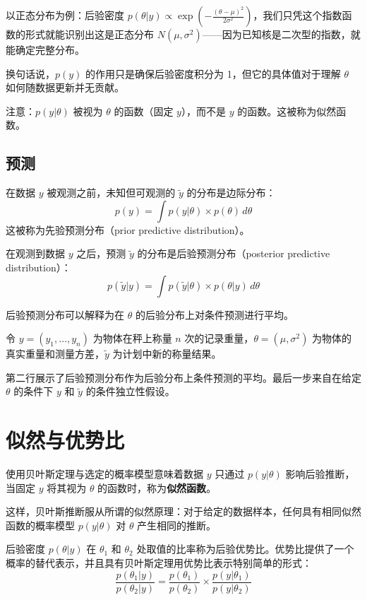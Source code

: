 以正态分布为例：后验密度 $p(\theta|y) \propto \exp\left(-\frac{(\theta-\mu)^2}{2\sigma^2}\right)$，我们只凭这个指数函数的形式就能识别出这是正态分布 $N(\mu, \sigma^2)$——因为已知核是二次型的指数，就能确定完整分布。

换句话说，$p(y)$ 的作用只是确保后验密度积分为 1，但它的具体值对于理解 $\theta$ 如何随数据更新并无贡献。

\begin{Remark}
  注意：$p(y|\theta)$ 被视为 $\theta$ 的函数（固定 $y$），而不是 $y$ 的函数。这被称为似然函数。
\end{Remark}

\subsection{预测}

在数据 $y$ 被观测之前，未知但可观测的 $\tilde{y}$ 的分布是边际分布：
\[
p(y) = \int p(y|\theta) \times p(\theta) \, d\theta
\]
这被称为先验预测分布（prior predictive distribution）。

在观测到数据 $y$ 之后，预测 $\tilde{y}$ 的分布是后验预测分布（posterior predictive distribution）：
\[
p(\tilde{y}|y) = \int p(\tilde{y}|\theta) \times p(\theta|y) \, d\theta
\]

后验预测分布可以解释为在 $\theta$ 的后验分布上对条件预测进行平均。

\begin{Example}[称重例子]
  令 $y = (y_1, \ldots, y_n)$ 为物体在秤上称量 $n$ 次的记录重量，$\theta = (\mu, \sigma^2)$ 为物体的真实重量和测量方差，$\tilde{y}$ 为计划中新的称量结果。

  第二行展示了后验预测分布作为后验分布上条件预测的平均。最后一步来自在给定 $\theta$ 的条件下 $y$ 和 $\tilde{y}$ 的条件独立性假设。
\end{Example}

\section{似然与优势比}

使用贝叶斯定理与选定的概率模型意味着数据 $y$ 只通过 $p(y|\theta)$ 影响后验推断，当固定 $y$ 将其视为 $\theta$ 的函数时，称为\textbf{似然函数}。

这样，贝叶斯推断服从所谓的似然原理：对于给定的数据样本，任何具有相同似然函数的概率模型 $p(y|\theta)$ 对 $\theta$ 产生相同的推断。

后验密度 $p(\theta|y)$ 在 $\theta_1$ 和 $\theta_2$ 处取值的比率称为后验优势比。优势比提供了一个概率的替代表示，并且具有贝叶斯定理用优势比表示特别简单的形式：
\[
\frac{p(\theta_1|y)}{p(\theta_2|y)} = \frac{p(\theta_1)}{p(\theta_2)} \times \frac{p(y|\theta_1)}{p(y|\theta_2)}
\]

